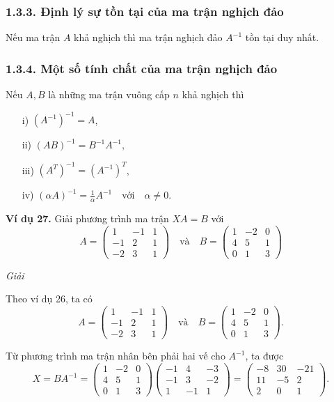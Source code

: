 \subsubsection*{1.3.3. Định lý sự tồn tại của ma trận nghịch đảo}

Nếu ma trận \(A\) khả nghịch thì ma trận nghịch đảo \(A^{-1}\) tồn tại duy nhất.

\subsubsection*{1.3.4. Một số tính chất của ma trận nghịch đảo}

Nếu \(A, B\) là những ma trận vuông cấp \(n\) khả nghịch thì
\begin{itemize}
    \item[i)] \((A^{-1})^{-1} = A\),
    \item[ii)] \((AB)^{-1} = B^{-1}A^{-1}\),
    \item[iii)] \((A^T)^{-1} = (A^{-1})^T\),
    \item[iv)] \((\alpha A)^{-1} = \frac{1}{\alpha} A^{-1} \quad \text{với} \quad \alpha \neq 0.\)
\end{itemize}

\textbf{Ví dụ 27.} Giải phương trình ma trận \(XA = B\) với
\[
A = \begin{pmatrix}
1 & -1 & 1 \\
-1 & 2 & 1 \\
-2 & 3 & 1
\end{pmatrix}
\quad \text{và} \quad
B = \begin{pmatrix}
1 & -2 & 0 \\
4 & 5 & 1 \\
0 & 1 & 3
\end{pmatrix}
\]

\textit{Giải}

Theo ví dụ 26, ta có
\[
A = \begin{pmatrix}
1 & -1 & 1 \\
-1 & 2 & 1 \\
-2 & 3 & 1
\end{pmatrix}
\quad \text{và} \quad
B = \begin{pmatrix}
1 & -2 & 0 \\
4 & 5 & 1 \\
0 & 1 & 3
\end{pmatrix}.
\]

Từ phương trình ma trận nhân bên phải hai vế cho \(A^{-1}\), ta được
\[
X = BA^{-1} = \begin{pmatrix}
1 & -2 & 0 \\
4 & 5 & 1 \\
0 & 1 & 3
\end{pmatrix}
\begin{pmatrix}
-1 & 4 & -3 \\
-1 & 3 & -2 \\
1 & -1 & 1
\end{pmatrix} = \begin{pmatrix}
-8 & 30 & -21 \\
11 & -5 & 2 \\
2 & 0 & 1
\end{pmatrix}.
\]

